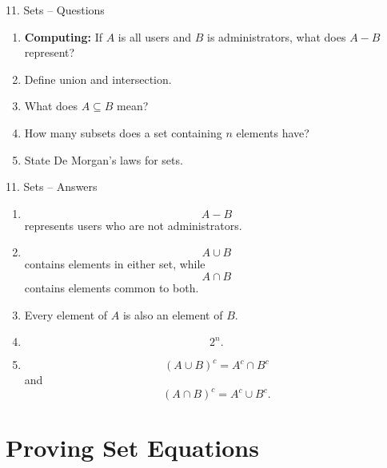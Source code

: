 \documentclass[aspectratio=169,11pt]{beamer}
\begin{document}
\begin{frame}{11. Sets -- Questions}

\begin{enumerate}
\item \textbf{Computing:} If $A$ is all users and $B$ is administrators, what does $A-B$ represent?

\item Define union and intersection.

\item What does $A\subseteq B$ mean?

\item How many subsets does a set containing $n$ elements have?

\item State De Morgan's laws for sets.
\end{enumerate}

\end{frame}

\begin{frame}{11. Sets -- Answers}

\begin{enumerate}
\item
\[
A-B
\]
represents users who are not administrators.

\item
\[
A\cup B
\]
contains elements in either set, while
\[
A\cap B
\]
contains elements common to both.

\item Every element of $A$ is also an element of $B$.

\item
\[
2^n.
\]

\item
\[
(A\cup B)^c=A^c\cap B^c
\]
and
\[
(A\cap B)^c=A^c\cup B^c.
\]
\end{enumerate}

\end{frame}


\section{Proving Set Equations}
\end{document}
